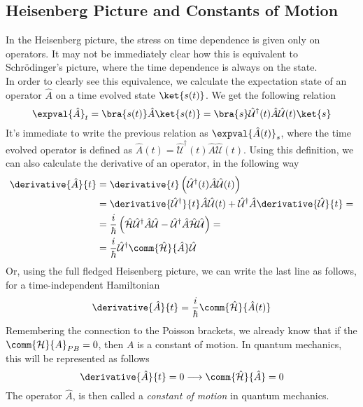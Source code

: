 \documentclass[a4paper, 11pt]{book}
\newcommand{\1}{\opr{\mathds{1}}}
\newcommand{\ham}{\mathcal{H}}
\newcommand{\opr}[1]{\hat{#1}}
\newcommand{\adj}[2][]{#2^{\dagger#1}}
\newcommand{\pcomm}[2]{\comm{#1}{#2}_{PB}}
\newcommand{\U}{\opr{\mathcal{U}}}
\theoremstyle{plain}
\begin{document}
	\subsection{Heisenberg Picture and Constants of Motion}
	In the Heisenberg picture, the stress on time dependence is given only on operators. It may not be immediately clear how this is equivalent to Schrödinger's picture, where the time dependence is always on the state.\\
	In order to clearly see this equivalence, we calculate the expectation state of an operator $\opr{A}$ on a time evolved state $\ket{s(t)}$. We get the following relation
	\begin{equation}
		\expval{\opr{A}}_t=\bra{s(t)}\opr{A}\ket{s(t)}=\bra{s}\adj{\U}(t)\opr{A}\U(t)\ket{s}
		\label{eq:timeevolvedexpval}
	\end{equation}
	It's immediate to write the previous relation as $\expval{\opr{A}(t)}_s$, where the time evolved operator is defined as $\opr{A}(t)=\adj{\U}(t)\opr{A}\U(t)$. Using this definition, we can also calculate the derivative of an operator, in the following way
	\begin{equation}
		\begin{aligned}
			\derivative{\opr{A}}{t}&=\derivative{t}\left( \adj{\U}(t)\opr{A}\U(t) \right)\\
			&=\derivative{\adj{\U}}{t}\opr{A}\U(t)+\adj{\U}\opr{A}\derivative{\U}{t}=\\
			&=\frac{i}{\hbar}\left( \opr{\ham}\adj{\U}\opr{A}\U-\adj{\U}\opr{A}\opr{\ham}\U \right)=\\
			&=\frac{i}{\hbar}\adj{\U}\comm{\opr{\ham}}{\opr{A}}\U
		\end{aligned}
		\label{eq:timederop}
	\end{equation}
	Or, using the full fledged Heisenberg picture, we can write the last line as follows, for a time-independent Hamiltonian
	\begin{equation}
		\derivative{\opr{A}}{t}=\frac{i}{\hbar}\comm{\opr{\ham}}{\opr{A}(t)}
		\label{eq:oprder}
	\end{equation}
	Remembering the connection to the Poisson brackets, we already know that if the $\pcomm{\ham}{A}=0$, then $A$ is a constant of motion. In quantum mechanics, this will be represented as follows
	\begin{equation}
		\derivative{\opr{A}}{t}=0\longrightarrow\comm{\opr{\ham}}{\opr{A}}=0
		\label{eq:constantofmotion}
	\end{equation}
	The operator $\opr{A}$, is then called a \textit{constant of motion} in quantum mechanics.
\end{document}
